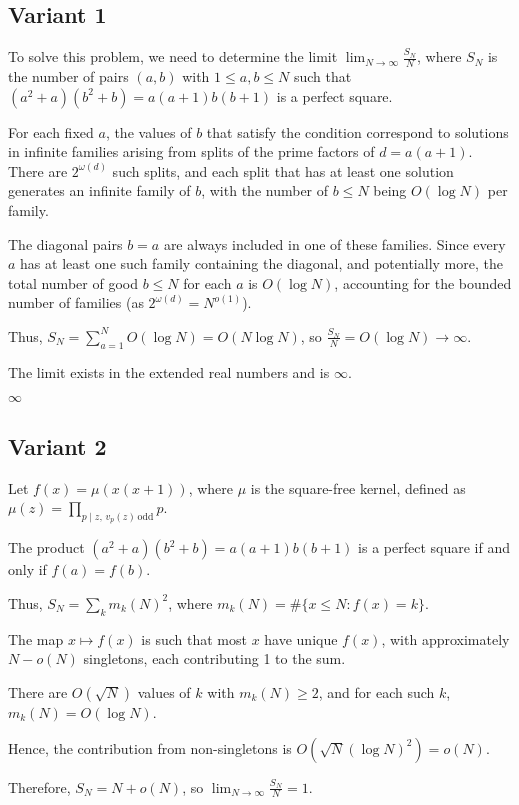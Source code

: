 \documentclass[12pt,a4paper]{article}
\theoremstyle{definition}
\begin{document}
\subsection{Variant 1}
    To solve this problem, we need to determine the limit $\lim_{N\to\infty} \frac{S_N}{N}$, where $S_N$ is the number of pairs $(a, b)$ with $1 \le a, b \le N$ such that $(a^2 + a)(b^2 + b) = a(a+1)b(b+1)$ is a perfect square.

    For each fixed $a$, the values of $b$ that satisfy the condition correspond to solutions in infinite families arising from splits of the prime factors of $d = a(a+1)$. There are $2^{\omega(d)}$ such splits, and each split that has at least one solution generates an infinite family of $b$, with the number of $b \le N$ being $O(\log N)$ per family.

    The diagonal pairs $b = a$ are always included in one of these families. Since every $a$ has at least one such family containing the diagonal, and potentially more, the total number of good $b \le N$ for each $a$ is $O(\log N)$, accounting for the bounded number of families (as $2^{\omega(d)} = N^{o(1)}$).

    Thus, $S_N = \sum_{a=1}^N O(\log N) = O(N \log N)$, so $\frac{S_N}{N} = O(\log N) \to \infty$.

    The limit exists in the extended real numbers and is $\infty$.

    $\boxed{\infty}$
\subsection{Variant 2}
    Let $f(x) = \mu(x(x+1))$, where $\mu$ is the square-free kernel, defined as $\mu(z) = \prod_{p \mid z, \, v_p(z) \, \text{odd}} p$.

    The product $(a^2 + a)(b^2 + b) = a(a+1) b(b+1)$ is a perfect square if and only if $f(a) = f(b)$.

    Thus, $S_N = \sum_k m_k(N)^2$, where $m_k(N) = \# \{ x \le N : f(x) = k \}$.

    The map $x \mapsto f(x)$ is such that most $x$ have unique $f(x)$, with approximately $N - o(N)$ singletons, each contributing 1 to the sum.

    There are $O(\sqrt{N})$ values of $k$ with $m_k(N) \ge 2$, and for each such $k$, $m_k(N) = O(\log N)$.

    Hence, the contribution from non-singletons is $O(\sqrt{N} (\log N)^2) = o(N)$.

    Therefore, $S_N = N + o(N)$, so $\lim_{N \to \infty} \frac{S_N}{N} = 1$.
\end{document}
